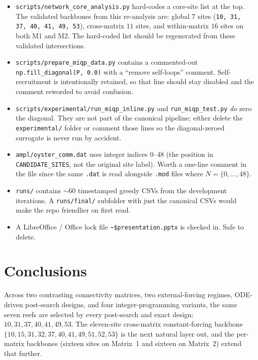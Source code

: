 \documentclass[11pt]{article}
\begin{document}
\begin{itemize}[leftmargin=1.4em, itemsep=0.2em]
  \item \texttt{scripts/network\_core\_analysis.py} hard-codes a core-site list at the top. The validated backbones from this re-analysis are: global $7$ sites (\texttt{10, 31, 37, 40, 41, 49, 53}), cross-matrix $11$ sites, and within-matrix $16$ sites on both M1 and M2. The hard-coded list should be regenerated from these validated intersections.
  \item \texttt{scripts/prepare\_miqp\_data.py} contains a commented-out \texttt{np.fill\_diagonal(P, 0.0)} with a ``remove self-loops'' comment. Self-recruitment is intentionally retained, so that line should stay disabled and the comment reworded to avoid confusion.
  \item \texttt{scripts/experimental/run\_miqp\_inline.py} and \texttt{run\_miqp\_test.py} \emph{do} zero the diagonal. They are not part of the canonical pipeline; either delete the \texttt{experimental/} folder or comment those lines so the diagonal-zeroed surrogate is never run by accident.
  \item \texttt{ampl/oyster\_comm.dat} uses integer indices $0$--$48$ (the position in \texttt{CANDIDATE\_SITES}, not the original site label). Worth a one-line comment in the file since the same \texttt{.dat} is read alongside \texttt{.mod} files where $N = \{0, \ldots, 48\}$.
  \item \texttt{runs/} contains $\sim 60$ timestamped greedy CSVs from the development iterations. A \texttt{runs/final/} subfolder with just the canonical CSVs would make the repo friendlier on first read.
  \item A LibreOffice / Office lock file \texttt{\~{}\$presentation.pptx} is checked in. Safe to delete.
\end{itemize}

\section{Conclusions}

Across two contrasting connectivity matrices, two external-forcing regimes, ODE-driven post-search designs, and four integer-programming variants, the same seven reefs are selected by every post-search and exact design: $10, 31, 37, 40, 41, 49, 53$. The eleven-site cross-matrix constant-forcing backbone $\{10, 15, 31, 32, 37, 40, 41, 49, 51, 52, 53\}$ is the next natural layer out, and the per-matrix backbones (sixteen sites on Matrix~1 and sixteen on Matrix~2) extend that further.
\end{document}
